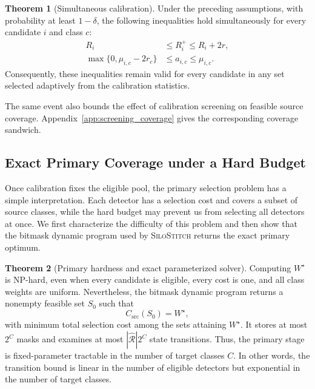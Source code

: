 \documentclass[conference]{IEEEtran}
\theoremstyle{definition}
\newtheorem{theorem}{Theorem}[section]
\newcommand{\Fname}{\textsc{SiloStitch}\xspace}
\begin{document}
\begin{theorem}[Simultaneous calibration]
\label{thm:simultaneous_calibration}
Under the preceding assumptions, with probability at least $1-\delta$, the following inequalities hold simultaneously for every candidate $i$ and class $c$:
\begin{align}
R_i&\le R_i^+\le R_i+2r,
\label{eq:simultaneous_risk}\\
\max\{0,\mu_{i,c}-2r_c\}
&\le a_{i,c}\le\mu_{i,c}.
\label{eq:simultaneous_class}
\end{align}
Consequently, these inequalities remain valid for every candidate in any set selected adaptively from the calibration statistics.
\end{theorem}


The same event also bounds the effect of calibration screening on feasible source coverage.
Appendix~\ref{app:screening_coverage} gives the corresponding coverage sandwich.

\subsection{Exact Primary Coverage under a Hard Budget}

Once calibration fixes the eligible pool, the primary selection problem has a simple interpretation.
Each detector has a selection cost and covers a subset of source classes, while the hard budget may prevent us from selecting all detectors at once.
We first characterize the difficulty of this problem and then show that the bitmask dynamic program used by \Fname returns the exact primary optimum.

\begin{theorem}[Primary hardness and exact parameterized solver]
\label{thm:primary_solver}
Computing $W^\star$ is NP-hard, even when every candidate is eligible, every cost is one, and all class weights are uniform.
Nevertheless, the bitmask dynamic program returns a nonempty feasible set $S_0$ such that
\begin{equation}
C_{\mathrm{src}}(S_0)=W^\star,
\end{equation}
with minimum total selection cost among the sets attaining $W^\star$.
It stores at most $2^C$ masks and examines at most $|\widehat{\mathcal R}|2^C$ state transitions.
Thus, the primary stage is fixed-parameter tractable in the number of target classes $C$.
In other words, the transition bound is linear in the number of eligible detectors but exponential in the number of target classes.
\end{theorem}
\end{document}
